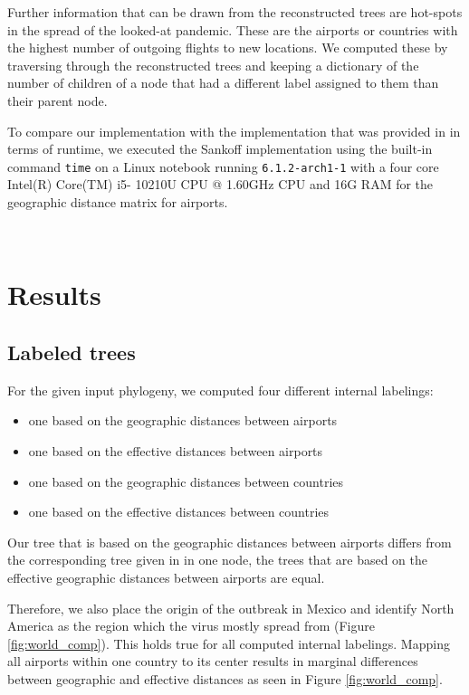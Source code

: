 \documentclass{article}
\begin{document}
Further information that can be drawn from the reconstructed trees are hot-spots
in the spread of the looked-at pandemic. These are the airports or countries
with the highest number of outgoing flights to new locations. We computed these
by traversing through the reconstructed trees and keeping a dictionary of the
number of children of a node that had a different label assigned to them than
their parent node.

To compare our implementation with the implementation that was provided in
\cite{reimeringPhylogeographicReconstructionUsing2020} in terms of runtime, we
executed the Sankoff implementation using the built-in command \texttt{time} on
a Linux notebook running \texttt{6.1.2-arch1-1} with a four core Intel(R)
Core(TM) i5- 10210U CPU @ 1.60GHz CPU and 16G RAM for the geographic distance
matrix for airports.

\ \\
\section{Results}

\subsection{Labeled trees}
For the given input phylogeny, we computed four different internal labelings: 
\begin{itemize}
    \item one based on the geographic distances between airports
    \item one based on the effective distances between airports
    \item one based on the geographic distances between countries
    \item one based on the effective distances between countries
\end{itemize}

Our tree that is based on the geographic distances between airports differs from
the corresponding tree given in
\cite{reimeringPhylogeographicReconstructionUsing2020} in one node, the trees
that are based on the effective geographic distances between airports are equal. 

Therefore, we also place the origin of the outbreak in Mexico and identify North
America as the region which the virus mostly spread from (Figure
\ref{fig:world_comp}). This holds true for all computed internal labelings.
Mapping all airports within one country to its center results in marginal
differences between geographic and effective distances as seen in Figure
\ref{fig:world_comp}. 
\end{document}
